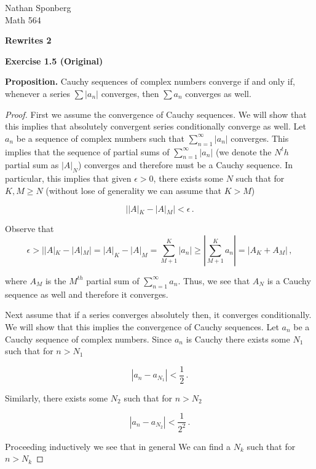 \documentclass[a4paper]{article}
\numberwithin{equation}{section}
\begin{document}
\begin{flushright}
{\small{Nathan Sponberg\\}}
{\small{Math 564}}
\end{flushright}

\begin{center}
\bf{Rewrites 2}
\end{center}

\begin{description}

\item \textbf{Exercise 1.5 (Original)} 

\textbf{Proposition.} Cauchy sequences of complex numbers converge if and only if, whenever a series $\sum |a_n|$ converges, then $\sum a_n$ converges as well.

\begin{proof} First we assume the convergence of Cauchy sequences. We will show that this implies that absolutely convergent series conditionally converge as well. Let ${a_n}$ be a sequence of complex numbers such that $\sum_{n=1}^\infty |a_n|$ converges. This implies that the sequence of partial sums of $\sum_{n=1}^\infty |a_n|$ (we denote the $N^th$ partial sum as $|A|_N$) converges and therefore must be a Cauchy sequence. In particular, this implies that given $\epsilon > 0$, there exists some $N$ such that for $K,M \geq N$ (without lose of generality we can assume that $K > M$) 

	$$||A|_K - |A|_M| < \epsilon\,.$$
	
	Observe that 
	$$\epsilon > ||A|_K - |A|_M| = |A|_K - |A|_M = \sum_{M+1}^K |a_n| \geq |\sum_{M+1}^K a_n| = |A_K +A_M|\,,$$
	
	where $A_M$ is the $M^{th}$ partial sum of $\sum_{n=1}^\infty a_n$. Thus, we see that ${A_N}$ is a Cauchy sequence as well and therefore it converges. 

Next assume that if a series converges absolutely then, it converges conditionally. We will show that this implies the convergence of Cauchy sequences. Let ${a_n}$ be a Cauchy sequence of complex numbers. Since ${a_n}$ is Cauchy there exists some $N_1$ such that for $n > N_1$

$$|a_n - a_{N_1}| < \frac{1}{2}\,.$$

Similarly, there exists some $N_2$ such that for $n > N_2$

$$|a_n - a_{N_2}| < \frac{1}{2^2}\,.$$

Proceeding inductively we see that in general We can find a $N_k$ such that for $n > N_k$


\end{proof}
\end{description}
\end{document}
